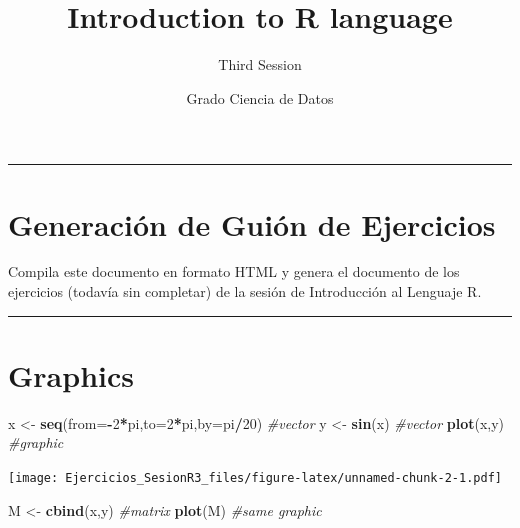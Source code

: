 \documentclass[
]{article}
\title{Introduction to R language}
\subtitle{Third Session}
\author{Grado Ciencia de Datos}
\date{}
\newenvironment{Shaded}{\begin{snugshade}}{\end{snugshade}}
\newcommand{\CommentTok}[1]{\textcolor[rgb]{0.56,0.35,0.01}{\textit{#1}}}
\newcommand{\DataTypeTok}[1]{\textcolor[rgb]{0.13,0.29,0.53}{#1}}
\newcommand{\DecValTok}[1]{\textcolor[rgb]{0.00,0.00,0.81}{#1}}
\newcommand{\KeywordTok}[1]{\textcolor[rgb]{0.13,0.29,0.53}{\textbf{#1}}}
\newcommand{\NormalTok}[1]{#1}
\newcommand{\OperatorTok}[1]{\textcolor[rgb]{0.81,0.36,0.00}{\textbf{#1}}}
\newcommand{\StringTok}[1]{\textcolor[rgb]{0.31,0.60,0.02}{#1}}
\begin{document}
\maketitle

\begin{center}\rule{0.5\linewidth}{0.5pt}\end{center}

\hypertarget{generaciuxf3n-de-guiuxf3n-de-ejercicios}{%
\section{Generación de Guión de
Ejercicios}\label{generaciuxf3n-de-guiuxf3n-de-ejercicios}}

Compila este documento en formato HTML y genera el documento de los
ejercicios (todavía sin completar) de la sesión de Introducción al
Lenguaje R.

\begin{center}\rule{0.5\linewidth}{0.5pt}\end{center}

\hypertarget{graphics}{%
\section{Graphics}\label{graphics}}

\begin{Shaded}
\begin{Highlighting}[]
\NormalTok{x <-}\StringTok{ }\KeywordTok{seq}\NormalTok{(}\DataTypeTok{from=}\OperatorTok{-}\DecValTok{2}\OperatorTok{*}\NormalTok{pi,}\DataTypeTok{to=}\DecValTok{2}\OperatorTok{*}\NormalTok{pi,}\DataTypeTok{by=}\NormalTok{pi}\OperatorTok{/}\DecValTok{20}\NormalTok{) }\CommentTok{#vector}
\NormalTok{y <-}\StringTok{ }\KeywordTok{sin}\NormalTok{(x) }\CommentTok{#vector}
\KeywordTok{plot}\NormalTok{(x,y) }\CommentTok{#graphic}
\end{Highlighting}
\end{Shaded}

\texttt{[image: Ejercicios\_SesionR3\_files/figure-latex/unnamed-chunk-2-1.pdf]}

\begin{Shaded}
\begin{Highlighting}[]
\NormalTok{M <-}\StringTok{ }\KeywordTok{cbind}\NormalTok{(x,y) }\CommentTok{#matrix}
\KeywordTok{plot}\NormalTok{(M) }\CommentTok{#same graphic}
\end{Highlighting}
\end{Shaded}
\end{document}
